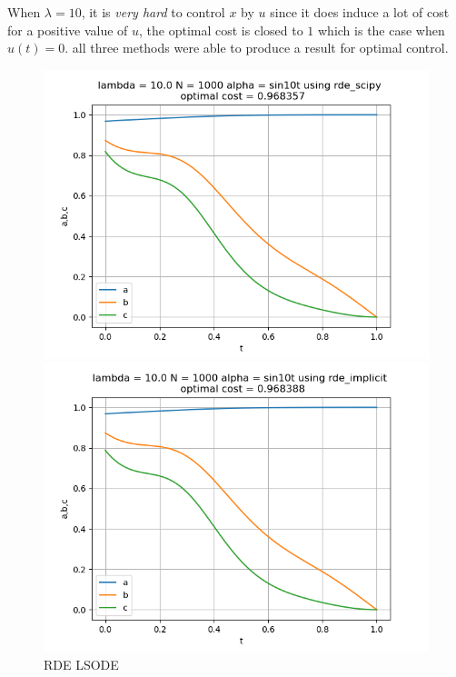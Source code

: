 When $\lambda = 10$, it is \textit{very hard} to control $x$ by $u$ since it does induce a lot of cost for a positive value of $u$, the optimal cost is closed to $1$ which is the case when $u(t) = 0$. all three methods were able to produce a result for optimal control.

\begin{figure}[H]
	\centering
	\begin{minipage}{0.3\textwidth}
		\centering
		\includegraphics[width=\linewidth]{rde_scipy_l10_alphasin.png}
		\caption{RDE LSODE}
	\end{minipage}
	\hfill
	\begin{minipage}{0.3\textwidth}
		\centering
		\includegraphics[width=\linewidth]{rde_implicit_l10_alphasin.png}

\end{minipage}
\end{figure}
